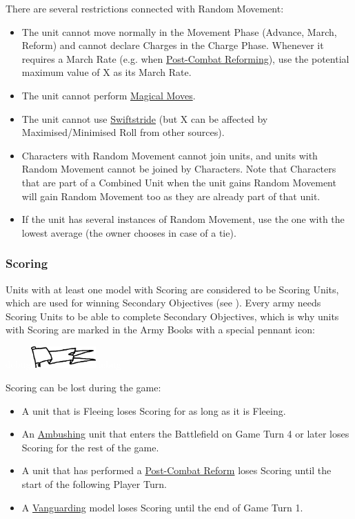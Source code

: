 There are several restrictions connected with Random Movement:

\begin{itemize}
	\item The unit cannot move normally in the Movement Phase (Advance, March, Reform) and cannot declare Charges in the Charge Phase. Whenever it requires a March Rate (e.g. when \hyperref[post_combat_reform]{Post-Combat Reforming}), use the potential maximum value of X as its March Rate.
	\item The unit cannot perform \hyperref[magical_move]{Magical Moves}.
	\item The unit cannot use \hyperref[swiftstride]{Swiftstride} (but X can be affected by Maximised/Minimised Roll from other sources).
	\item Characters with Random Movement cannot join units, and units with Random Movement cannot be joined by Characters. Note that Characters that are part of a Combined Unit when the unit gains Random Movement will gain Random Movement too as they are already part of that unit.
	\item If the unit has several instances of Random Movement, use the one with the lowest average (the owner chooses in case of a tie).
\end{itemize}

\columnbreak

\subsubsection{Scoring}
\idx[main=y]{\scoring}\label{scoring}

Units with at least one model with Scoring are considered to be Scoring Units, which are used for winning Secondary Objectives (see ). Every army needs Scoring Units to be able to complete Secondary Objectives, which is why units with Scoring are marked in the Army Books with a special pennant icon:

\begin{center}
	\textcolor{white}{debug}\includegraphics[width=2.5cm]{../Layout/pics/logo_scoring.png}\textcolor{white}{debug}
\end{center}

Scoring can be lost during the game:
\begin{itemize}
	\item A unit that is Fleeing loses Scoring for as long as it is Fleeing.
	\item An \hyperref[ambush]{Ambushing} unit that enters the Battlefield on Game Turn 4 or later loses Scoring for the rest of the game.
	\item A unit that has performed a \hyperref[post_combat_reform]{Post-Combat Reform} loses Scoring until the start of the following Player Turn.
	\item A \hyperref[vanguard]{Vanguarding} model loses Scoring until the end of Game Turn 1.
\end{itemize}

